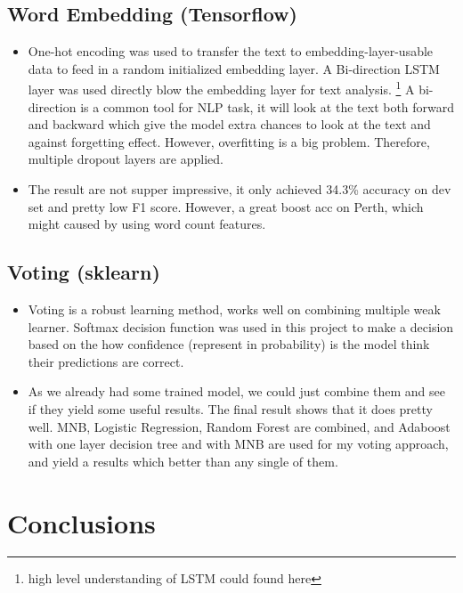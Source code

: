 \documentclass[11pt]{article}
\begin{document}
\subsection{Word Embedding (Tensorflow)}
\begin{itemize}
      \item One-hot encoding was used to transfer the text to embedding-layer-usable data to feed in a 
            random initialized embedding layer. A Bi-direction LSTM layer 
            was used directly blow the embedding layer for text analysis.
            \footnote{high level understanding of LSTM could found here }
            A bi-direction is a common tool for NLP task, it will look at the text both forward and 
            backward which give the model extra chances to look at the text and against forgetting effect.
            However, overfitting is a big problem. Therefore, multiple dropout layers are applied.
      \item The result are not supper impressive, it only achieved 34.3\% accuracy on dev set and pretty
            low F1 score. However, a great boost acc on Perth, which might caused by using word count 
            features.
\end{itemize}

\subsection{Voting (sklearn)}
\begin{itemize}
      \item Voting is a robust learning method, works well on combining
            multiple weak learner. Softmax decision function was used in this project
            to make a decision based on the how confidence (represent in probability) 
            is the model think their predictions are correct.
      \item As we already had some trained model, we could just combine them and 
            see if they yield some useful results. The final result shows that it does
            pretty well. MNB, Logistic Regression, Random Forest are combined, and Adaboost with one layer
            decision tree and with MNB are used for my voting approach, 
            and yield a results which better than any single of them.
            
\end{itemize}

\section{Conclusions}
\end{document}
